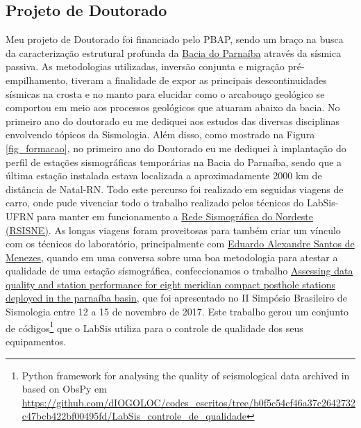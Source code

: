\documentclass[10pt,a4paper,oneside]{book}
\begin{document}
\subsection{Projeto de Doutorado}
\label{sec_proj_doc}

Meu projeto de Doutorado foi financiado pelo PBAP, sendo um braço na busca da caracterização estrutural profunda da \href{https://www.gov.br/anp/pt-br/rodadas-anp/rodadas-concluidas/concessao-de-blocos-exploratorios/14a-rodada-licitacoes-blocos/arquivos/areas-oferta/sumario-parnaiba.pdf}{Bacia do Parnaíba} através da sísmica passiva. As metodologias utilizadas, inversão conjunta e migração pré-empilhamento, tiveram a finalidade de expor as principais descontinuidades sísmicas na crosta e no manto para elucidar como o arcabouço geológico se comportou em meio aos processos geológicos que atuaram abaixo da bacia. No primeiro ano do doutorado eu me dediquei aos estudos das diversas disciplinas envolvendo tópicos da Sismologia. Além disso, como mostrado na Figura \ref{fig_formacao}, no primeiro ano do Doutorado eu me dediquei à implantação do perfil de estações sismográficas temporárias na Bacia do Parnaíba, sendo que a última estação instalada estava localizada a aproximadamente 2000 km de distância de Natal-RN. Todo este percurso foi realizado em seguidas viagens de carro, onde pude vivenciar todo o trabalho realizado pelos técnicos do LabSis-UFRN para manter em funcionamento a \href{https://labsis.ufrn.br/}{Rede Sismográfica do Nordeste (RSISNE)}. As longas viagens foram proveitosas para também criar um vínculo com os técnicos do laboratório, principalmente com \href{http://lattes.cnpq.br/0406798380417692}{Eduardo Alexandre Santos de Menezes}, quando em uma conversa sobre uma boa metodologia para atestar a qualidade de uma estação sísmográfica, confeccionamos o trabalho \href{https://dx.doi.org/10.6084/m9.figshare.25367143}{Assessing data quality and station performance for eight meridian compact posthole stations deployed in the parnaíba basin}, que foi apresentado no II Simpósio Brasileiro de Sismologia entre 12 a 15 de novembro de 2017. Este trabalho gerou um conjunto de códigos\footnote{Python framework for analysing the quality of seismological data archived in based on ObsPy em \url{https://github.com/dIOGOLOC/codes_escritos/tree/b0f5c54cf46a37c2642732c47bcb422bf00495fd/LabSis_controle_de_qualidade}} que o LabSis utiliza para o controle de qualidade dos seus equipamentos.  
\end{document}
